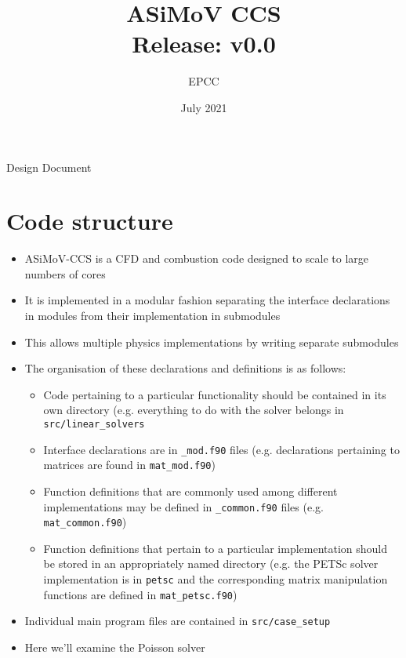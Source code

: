 \documentclass[11pt]{article}
\begin{document}
\lstset{style=codefragment}


\title{ASiMoV CCS\\\small{Release: v0.0}}

\date{July 2021}
\author{EPCC}

\makeEPCCtitle

\centerline{\sc Design Document}

\tableofcontents
\pagebreak

\bigskip


\bigskip

\section{Code structure}

\begin{itemize}
  \item ASiMoV-CCS is a CFD and combustion code designed to scale to large numbers of cores
  \item It is implemented in a modular fashion separating the interface declarations in modules from their implementation in submodules
  \item This allows multiple physics implementations by writing separate submodules
  \item The organisation of these declarations and definitions is as follows:
  \begin{itemize}
    \item Code pertaining to a particular functionality should be contained in its own directory (e.g. everything to do with the solver belongs in \texttt{src/linear\_solvers}
    \item Interface declarations are in \texttt{\_mod.f90} files (e.g. declarations pertaining to matrices are found in \texttt{mat\_mod.f90})
    \item Function definitions that are commonly used among different implementations may be defined in \texttt{\_common.f90} files (e.g. \texttt{mat\_common.f90})
    \item Function definitions that pertain to a particular implementation should be stored in an appropriately named directory (e.g. the PETSc solver implementation is in \texttt{petsc} and the corresponding matrix manipulation functions are defined in \texttt{mat\_petsc.f90})
  \end{itemize}
  \item Individual main program files are contained in \texttt{src/case\_setup}
  \item Here we'll examine the Poisson solver
\end{itemize}
\end{document}
